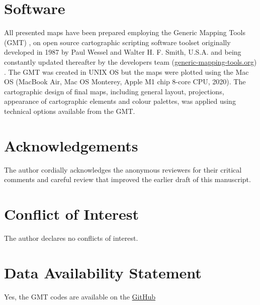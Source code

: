 \documentclass[]{interact}
\begin{document}
\section{Software}
All presented maps have been prepared employing the Generic Mapping Tools (GMT) \cite{WesselSmith1991,WesselSmith1995}, on open source cartographic scripting software toolset originally developed in 1987 by Paul Wessel and Walter H. F. Smith, U.S.A. and being constantly updated thereafter by the developers team (\href{https://www.generic-mapping-tools.org/}{generic-mapping-tools.org}) \cite{Wesseletal2013,Wesseletal2019}. The GMT was created in UNIX OS but the maps were plotted using the Mac OS (MacBook Air, Mac OS Monterey, Apple M1 chip 8-core CPU, 2020). The cartographic design of final maps, including general  layout, projections, appearance of cartographic elements and colour palettes, was applied using technical options available from the GMT.

\section{Acknowledgements}
The author cordially acknowledges the anonymous reviewers for their critical comments and careful review that improved the earlier draft of this manuscript.
    
\section{Conflict of Interest}
    The author declares no conflicts of interest.
    
\section{Data Availability Statement}
    Yes, the GMT codes are available on the \href{https://github.com/paulinelemenkova/Mapping-Somali-Sea-and-the-Seychelles}{GitHub}



\end{document}
